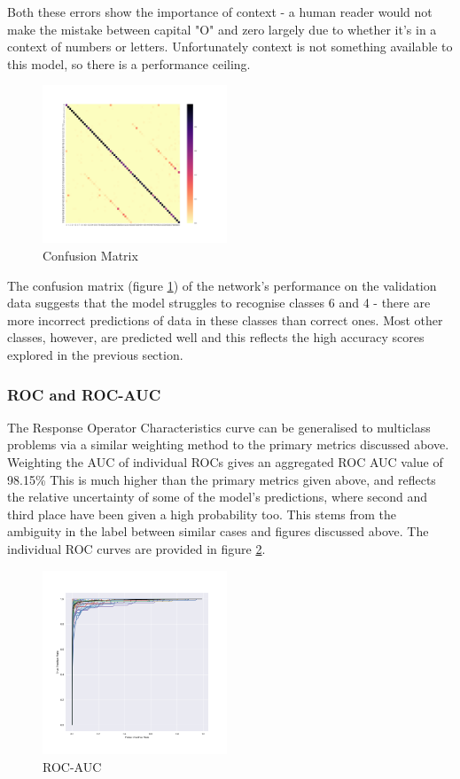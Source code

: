 \documentclass[fleqn,10pt]{SelfArx} %
\begin{document}
Both these errors show the importance of context - a human reader would not make the mistake between capital "O" and zero largely due to whether it's in a context of numbers or letters. Unfortunately context is not something available to this model, so there is a performance ceiling.\begin{figure}[ht]\centering
\includegraphics[width=0.49\textwidth]{confusion_matrix}
\caption{Confusion Matrix}
\label{fig:confusion_matrix}
\end{figure}
The confusion matrix (figure \ref{fig:confusion_matrix}) of the network's performance on the validation data suggests that the model struggles to recognise classes 6 and 4 - there are more incorrect predictions of data in these classes than correct ones. Most other classes, however, are predicted well and this reflects the high accuracy scores explored in the previous section.

\subsubsection{ROC and ROC-AUC}
The Response Operator Characteristics curve can be generalised to multiclass problems via a similar weighting method to the primary metrics discussed above. Weighting the AUC of individual ROCs gives an aggregated ROC AUC value of 98.15\% This is much higher than the primary metrics given above, and reflects the relative uncertainty of some of the model's predictions, where second and third place have been given a high probability too. This stems from the ambiguity in the label between similar cases and figures discussed above. The individual ROC curves are provided in figure \ref{fig:roc}.
\begin{figure}[ht]\centering
\includegraphics[width=0.49\textwidth]{roc_curves}
\caption{ROC-AUC}
\label{fig:roc}
\end{figure}
\end{document}

